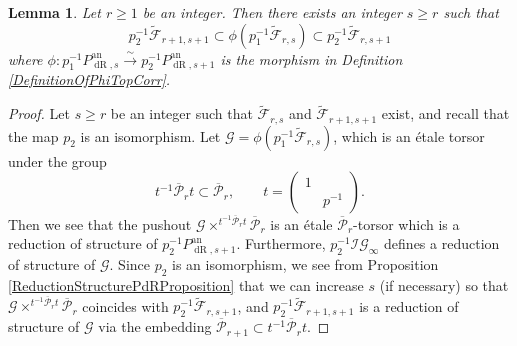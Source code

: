 \documentclass[10pt, oneside]{amsart}
\renewcommand{\tilde}{\widetilde}
\numberwithin{equation}{subsection}
\newtheorem{lemma}[equation]{Lemma}
\theoremstyle{definition}
\theoremstyle{remark}
\newcommand{\opn}[1]{\operatorname{#1}}
\newcommand{\tbyt}[4]{\left( \begin{matrix} #1 & #2 \\ #3 & #4 \end{matrix} \right)}
\begin{document}
\begin{lemma} \label{PhiRestrictsToIsoLemma}
    Let $r \geq 1$ be an integer. Then there exists an integer $s \geq r$ such that
    \[
    p_2^{-1}\tilde{\mathcal{F}}_{r+1, s+1} \subset \phi\left(  p_1^{-1}\tilde{\mathcal{F}}_{r, s} \right) \subset p_2^{-1}\tilde{\mathcal{F}}_{r, s+1}
    \]
    where $\phi \colon p_1^{-1}P_{\opn{dR}, s}^{\opn{an}} \xrightarrow{\sim} p_2^{-1}P_{\opn{dR}, s+1}^{\opn{an}}$ is the morphism in Definition \ref{DefinitionOfPhiTopCorr}.
\end{lemma}
\begin{proof}
    Let $s \geq r$ be an integer such that $\tilde{\mathcal{F}}_{r, s}$ and $\tilde{\mathcal{F}}_{r+1, s+1}$ exist, and recall that the map $p_2$ is an isomorphism. Let $\mathscr{G} = \phi(p_1^{-1}\tilde{\mathcal{F}}_{r, s})$, which is an \'{e}tale torsor under the group
    \[
    t^{-1} \overline{\mathcal{P}}_r t \subset \overline{\mathcal{P}}_{r} , \quad \quad t = \tbyt{1}{}{}{p^{-1}} .
    \]
    Then we see that the pushout $\mathscr{G} \times^{t^{-1} \overline{\mathcal{P}}_r t} \overline{\mathcal{P}}_{r}$ is an \'{e}tale $\overline{\mathcal{P}}_{r}$-torsor which is a reduction of structure of $p_2^{-1}P_{\opn{dR}, s+1}^{\opn{an}}$. Furthermore, $p_2^{-1}\mathcal{IG}_{\infty}$ defines a reduction of structure of $\mathscr{G}$. Since $p_2$ is an isomorphism, we see from Proposition \ref{ReductionStructurePdRProposition} that we can increase $s$ (if necessary) so that $\mathscr{G} \times^{t^{-1} \overline{\mathcal{P}}_r t} \overline{\mathcal{P}}_{r}$ coincides with $p_2^{-1}\tilde{\mathcal{F}}_{r, s+1}$, and $p_2^{-1}\tilde{\mathcal{F}}_{r+1, s+1}$ is a reduction of structure of $\mathscr{G}$ via the embedding $\overline{\mathcal{P}}_{r+1} \subset t^{-1} \overline{\mathcal{P}}_r t$.
\end{proof}
\end{document}
